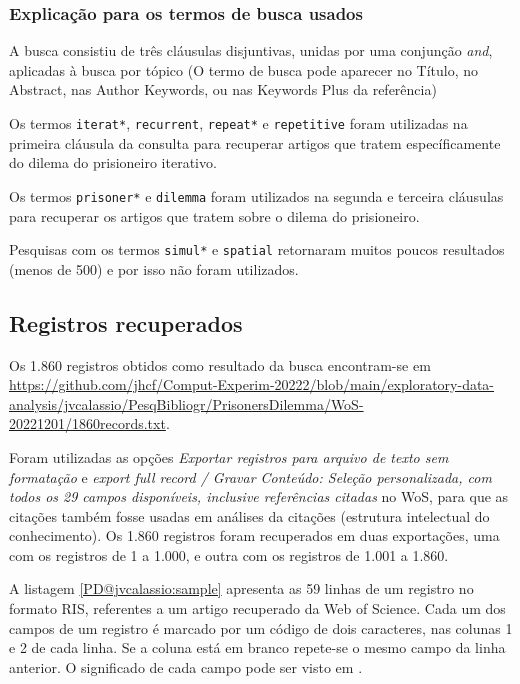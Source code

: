\subsubsection{Explicação para os termos de busca usados\label{PD@jvcalassio:query}}

A busca consistiu de três cláusulas disjuntivas, unidas por uma conjunção \textit{and}, aplicadas à busca por tópico (O termo de busca pode aparecer no Título, no Abstract, nas Author Keywords, ou nas Keywords Plus da referência)

Os termos \texttt{iterat*}, \texttt{recurrent}, \texttt{repeat*} e \texttt{repetitive}
foram utilizadas na primeira cláusula da consulta para recuperar artigos que tratem específicamente do
dilema do prisioneiro iterativo.

Os termos \texttt{prisoner*} e \texttt{dilemma} foram utilizados na segunda e terceira cláusulas para recuperar os artigos que tratem sobre o dilema do prisioneiro.

Pesquisas com os termos \texttt{simul*} e \texttt{spatial} retornaram muitos poucos resultados (menos de 500) e por isso não foram utilizados.

\subsection{Registros recuperados}

Os 1.860 registros obtidos como resultado da busca encontram-se em \url{https://github.com/jhcf/Comput-Experim-20222/blob/main/exploratory-data-analysis/jvcalassio/PesqBibliogr/PrisonersDilemma/WoS-20221201/1860records.txt}. 

Foram utilizadas as opções \textit{Exportar registros para arquivo de texto sem formatação} e \textit{export full record / Gravar Conteúdo: Seleção personalizada, com todos os 29 campos disponíveis, inclusive referências citadas} no WoS, para que as citações também fosse usadas em análises da citações (estrutura intelectual do conhecimento). Os 1.860 registros foram recuperados em duas exportações, uma com os registros de 1 a 1.000, e outra com os registros de 1.001 a 1.860.

A listagem \ref{PD@jvcalassio:sample} apresenta as 59 linhas de um registro no formato RIS, referentes a um artigo recuperado da Web of Science. Cada um dos campos de um registro é marcado por um código de dois caracteres, nas colunas 1 e 2 de cada linha. Se a coluna está em branco repete-se o mesmo campo da linha anterior.
O significado de cada campo pode ser visto em \citep{wikipedia_ris_2017}.

